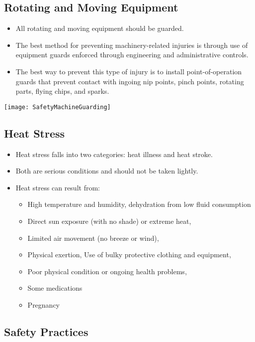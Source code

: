 \subsection{Rotating and Moving Equipment}

\begin{itemize}
\item All rotating and moving equipment should be guarded. 
\item The best method for preventing machinery-related injuries is through use of equipment guards enforced through engineering and administrative controls.   
\item The best way to prevent this type of injury is to install point-of-operation guards that prevent contact with ingoing nip points, pinch points, rotating parts, flying chips, and sparks.
\end{itemize}
\begin{center}
\texttt{[image: SafetyMachineGuarding]}\\
\end{center}

\subsection{Heat Stress}
\begin{itemize}
\item Heat stress falls into two categories: heat illness and heat stroke. 
\item Both are serious conditions and should not be taken lightly. 
\item Heat stress can result from: 
\begin{itemize}
\item High temperature and humidity, dehydration from low fluid consumption
\item Direct sun exposure (with no shade) or extreme heat, 
\item Limited air movement (no breeze or wind), 
\item Physical exertion, Use of bulky protective clothing and equipment, 
\item Poor physical condition or ongoing health problems, 
\item Some medications
\item Pregnancy
\end{itemize}
\end{itemize} 


\subsection{Safety Practices}
